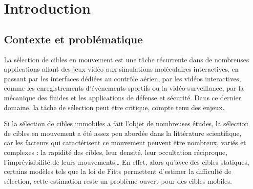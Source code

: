 

\chapter*{Introduction} %
\mtcaddchapter %


\section*{Contexte et problématique}
	La sélection de cibles en mouvement est une tâche récurrente dans de nombreuses applications allant des jeux vidéo aux simulations moléculaires interactives, en passant par les interfaces dédiées au contrôle aérien, par les vidéos interactives, comme les enregistrements d'événements sportifs ou la vidéo-surveillance, par la mécanique des fluides et les applications de défense et sécurité. Dans ce dernier domaine, la tâche de sélection peut être critique, compte tenu des enjeux.
	
	Si la sélection de cibles immobiles a fait l'objet de nombreuses études, la sélection de cibles en mouvement a été assez peu abordée dans la littérature scientifique, car les facteurs qui caractérisent ce mouvement peuvent être nombreux, variés et complexes : la rapidité des cibles, leur densité, leur occultation réciproque, l'imprévisibilité de leurs mouvements\ldots{} En effet, alors qu’avec des cibles statiques, certains modèles tels que la loi de Fitts permettent d’estimer la difficulté de sélection, cette estimation reste un problème ouvert pour des cibles mobiles.
	
